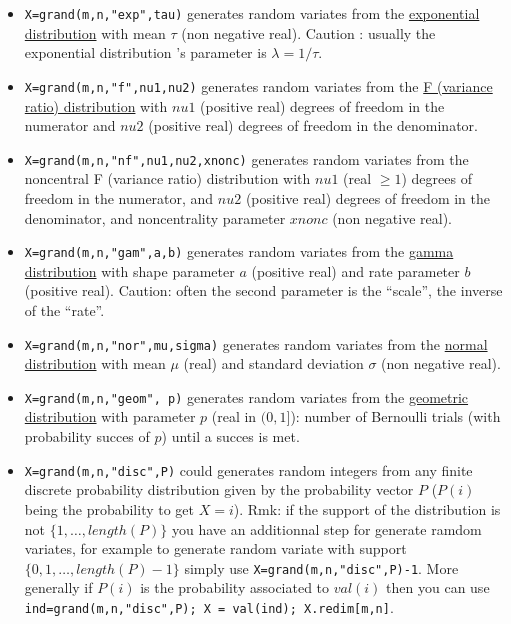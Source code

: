 \begin{description}
\begin{itemize}
\item {} \verb!X=grand(m,n,"exp",tau)! generates random variates from the  \hyperlink{exppdf}{exponential
  distribution} with mean $\tau$ (non negative real). Caution : usually
  the exponential distribution 's parameter is $\lambda= 1/\tau$.  
  
\item {} 
  \verb!X=grand(m,n,"f",nu1,nu2)! generates random variates from the \hyperlink{fpdf}{F 
  (variance ratio) distribution} with $nu1$ (positive real)
  degrees of freedom in the numerator and $nu2$ (positive real) 
  degrees of freedom in the denominator. 
  
\item {} 
  \verb!X=grand(m,n,"nf",nu1,nu2,xnonc)! generates random variates from the noncentral 
  F (variance ratio)  distribution with $nu1$ (real $\ge 1$) degrees of freedom 
  in the numerator, and $nu2$ (positive real) degrees of freedom in the denominator, 
  and noncentrality parameter $xnonc$ (non negative real). 
  
\item {} \verb!X=grand(m,n,"gam",a,b)! generates random variates from the  \hyperlink{gampdf}{gamma 
  distribution} with shape parameter $a$ (positive real) and rate
  parameter $b$ (positive real). Caution: often the second parameter
  is the ``scale'', the inverse of the ``rate''.  
  
\item {} 
  \verb!X=grand(m,n,"nor",mu,sigma)! generates random variates from the \hyperlink{norpdf}{normal 
  distribution} with mean $\mu$ (real)  and standard deviation $\sigma$
  (non negative real). 
  
\item {} \verb!X=grand(m,n,"geom", p)! generates random variates from the \hyperlink{geompdf}{geometric
  distribution} with parameter $p$ (real in $(0,1]$): number of Bernoulli trials (with 
  probability succes of $p$) until a succes is met.

\item {} 
  \verb!X=grand(m,n,"disc",P)! could generates random integers from any
  finite discrete probability distribution given by the probability
  vector $P$ ($P(i)$ being the probability to get $X=i$). Rmk: if the 
  support of the distribution is not $\{1,\dots,length(P)\}$ you have
  an additionnal step for generate ramdom variates, for example to
  generate random variate with support  $\{0,1,\dots,length(P)-1\}$
  simply use \verb!X=grand(m,n,"disc",P)-1!. More generally if $P(i)$ is
  the probability associated to $val(i)$ then you can use 
  \verb!ind=grand(m,n,"disc",P); X = val(ind); X.redim[m,n]!. 
  

\end{itemize}
\end{description}
